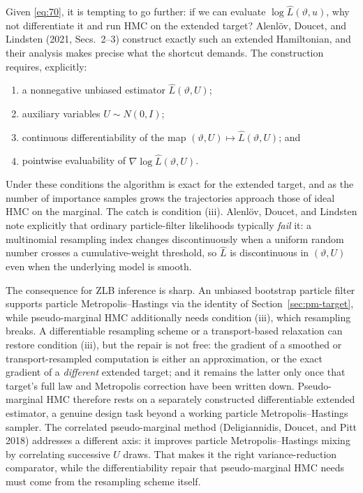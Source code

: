 \documentclass[11pt]{article}
\begin{document}
Given \eqref{eq:70}, it is tempting to go further: if we can evaluate
$\log\widehat L(\vartheta,u)$, why not differentiate it and run HMC on the
extended target? Alenl\"ov, Doucet, and Lindsten (2021, Secs.~2--3) construct
exactly such an extended Hamiltonian, and their analysis makes precise what the
shortcut demands. The construction requires, explicitly:
\begin{enumerate}
\item a nonnegative unbiased estimator $\widehat L(\vartheta,U)$;
\item auxiliary variables $U\sim N(0,I)$;
\item continuous differentiability of the map
      $(\vartheta,U)\mapsto\widehat L(\vartheta,U)$; and
\item pointwise evaluability of $\nabla\log\widehat L(\vartheta,U)$.
\end{enumerate}
Under these conditions the algorithm is exact for the extended target, and as
the number of importance samples grows the trajectories approach those of ideal
HMC on the marginal. The catch is condition (iii). Alenl\"ov, Doucet, and
Lindsten note explicitly that ordinary particle-filter likelihoods typically
\emph{fail} it: a multinomial resampling index changes discontinuously when a
uniform random number crosses a cumulative-weight threshold, so
$\widehat L$ is discontinuous in $(\vartheta,U)$ even when the underlying model
is smooth.

The consequence for ZLB inference is sharp. An unbiased bootstrap particle
filter supports particle Metropolis--Hastings via the identity of
Section~\ref{sec:pm-target}, while pseudo-marginal HMC additionally needs
condition (iii), which resampling breaks. A differentiable resampling scheme
or a transport-based relaxation can restore
condition (iii), but the repair is not free: the gradient of a smoothed or
transport-resampled computation is either an approximation, or the exact
gradient of a \emph{different} extended target; and it remains the latter
only once that target's full law and Metropolis correction have been written
down. Pseudo-marginal HMC therefore rests on a separately constructed
differentiable extended estimator, a genuine design task beyond a working
particle Metropolis--Hastings sampler. The correlated pseudo-marginal method
(Deligiannidis, Doucet, and Pitt
2018) addresses a different axis: it improves particle Metropolis--Hastings
mixing by correlating
successive $U$ draws. That makes it the right variance-reduction comparator,
while the differentiability repair that pseudo-marginal HMC needs must come
from the resampling scheme itself.
\end{document}
